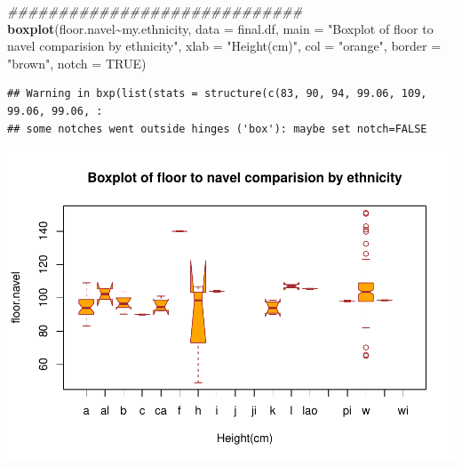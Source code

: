 \documentclass[]{article}
\newenvironment{Shaded}{\begin{snugshade}}{\end{snugshade}}
\newcommand{\CommentTok}[1]{\textcolor[rgb]{0.56,0.35,0.01}{\textit{#1}}}
\newcommand{\DataTypeTok}[1]{\textcolor[rgb]{0.13,0.29,0.53}{#1}}
\newcommand{\KeywordTok}[1]{\textcolor[rgb]{0.13,0.29,0.53}{\textbf{#1}}}
\newcommand{\NormalTok}[1]{#1}
\newcommand{\OperatorTok}[1]{\textcolor[rgb]{0.81,0.36,0.00}{\textbf{#1}}}
\newcommand{\OtherTok}[1]{\textcolor[rgb]{0.56,0.35,0.01}{#1}}
\newcommand{\StringTok}[1]{\textcolor[rgb]{0.31,0.60,0.02}{#1}}
\begin{document}
\begin{Shaded}
\begin{Highlighting}[]
\CommentTok{\#\#\#\#\#\#\#\#\#\#\#\#\#\#\#\#\#\#\#\#\#\#\#\#\#\#\#\#\#}
\KeywordTok{boxplot}\NormalTok{(floor.navel}\OperatorTok{\textasciitilde{}}\NormalTok{my.ethnicity,}
\DataTypeTok{data =}\NormalTok{ final.df,}
\DataTypeTok{main =} \StringTok{"Boxplot of floor to navel comparision by ethnicity"}\NormalTok{,}
\DataTypeTok{xlab =} \StringTok{"Height(cm)"}\NormalTok{,}
\DataTypeTok{col =} \StringTok{"orange"}\NormalTok{,}
\DataTypeTok{border =} \StringTok{"brown"}\NormalTok{,}
\DataTypeTok{notch =} \OtherTok{TRUE}\NormalTok{)}
\end{Highlighting}
\end{Shaded}

\begin{verbatim}
## Warning in bxp(list(stats = structure(c(83, 90, 94, 99.06, 109, 99.06, 99.06, :
## some notches went outside hinges ('box'): maybe set notch=FALSE
\end{verbatim}

\includegraphics{project-measure_files/figure-latex/boxplots-3.pdf}

\begin{Shaded}
\end{Shaded}
\end{document}
